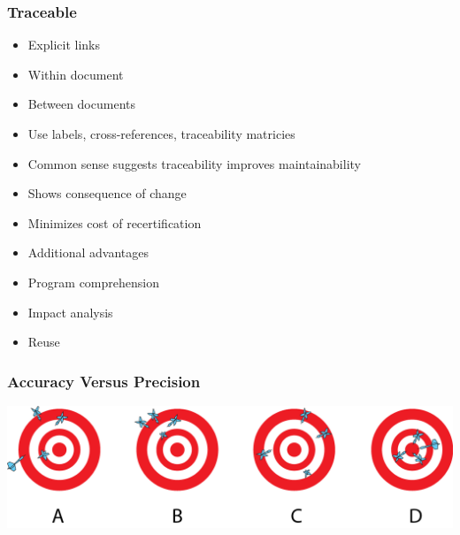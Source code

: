 \documentclass[t,12pt,numbers,fleqn]{beamer}
\begin{document}

\begin{frame}
\frametitle{Traceable}

\begin{itemize}

\item Explicit links
\bi
\item Within document
\item Between documents
\ei
\item Use labels, cross-references, traceability matricies
\item Common sense suggests traceability improves maintainability
\item Shows consequence of change
\item Minimizes cost of recertification
\item Additional advantages
\bi
\item Program comprehension
\item Impact analysis
\item Reuse
\ei
\end{itemize}

\end{frame}


\begin{frame}
\frametitle{Accuracy Versus Precision}

\begin{center}
 \includegraphics[width=1.0\textwidth]{../Figures/AccuracyPrecision_FromUniversityOfHawaiiAtManoa.png}
\end{center}


\end{frame}

\end{document}
